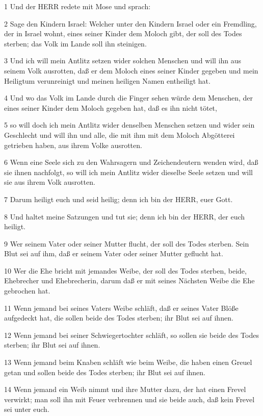\par 1 Und der HERR redete mit Mose und sprach:
\par 2 Sage den Kindern Israel: Welcher unter den Kindern Israel oder ein Fremdling, der in Israel wohnt, eines seiner Kinder dem Moloch gibt, der soll des Todes sterben; das Volk im Lande soll ihn steinigen.
\par 3 Und ich will mein Antlitz setzen wider solchen Menschen und will ihn aus seinem Volk ausrotten, daß er dem Moloch eines seiner Kinder gegeben und mein Heiligtum verunreinigt und meinen heiligen Namen entheiligt hat.
\par 4 Und wo das Volk im Lande durch die Finger sehen würde dem Menschen, der eines seiner Kinder dem Moloch gegeben hat, daß es ihn nicht tötet,
\par 5 so will doch ich mein Antlitz wider denselben Menschen setzen und wider sein Geschlecht und will ihn und alle, die mit ihm mit dem Moloch Abgötterei getrieben haben, aus ihrem Volke ausrotten.
\par 6 Wenn eine Seele sich zu den Wahrsagern und Zeichendeutern wenden wird, daß sie ihnen nachfolgt, so will ich mein Antlitz wider dieselbe Seele setzen und will sie aus ihrem Volk ausrotten.
\par 7 Darum heiligt euch und seid heilig; denn ich bin der HERR, euer Gott.
\par 8 Und haltet meine Satzungen und tut sie; denn ich bin der HERR, der euch heiligt.
\par 9 Wer seinem Vater oder seiner Mutter flucht, der soll des Todes sterben. Sein Blut sei auf ihm, daß er seinem Vater oder seiner Mutter geflucht hat.
\par 10 Wer die Ehe bricht mit jemandes Weibe, der soll des Todes sterben, beide, Ehebrecher und Ehebrecherin, darum daß er mit seines Nächsten Weibe die Ehe gebrochen hat.
\par 11 Wenn jemand bei seines Vaters Weibe schläft, daß er seines Vater Blöße aufgedeckt hat, die sollen beide des Todes sterben; ihr Blut sei auf ihnen.
\par 12 Wenn jemand bei seiner Schwiegertochter schläft, so sollen sie beide des Todes sterben; ihr Blut sei auf ihnen.
\par 13 Wenn jemand beim Knaben schläft wie beim Weibe, die haben einen Greuel getan und sollen beide des Todes sterben; ihr Blut sei auf ihnen.
\par 14 Wenn jemand ein Weib nimmt und ihre Mutter dazu, der hat einen Frevel verwirkt; man soll ihn mit Feuer verbrennen und sie beide auch, daß kein Frevel sei unter euch.
